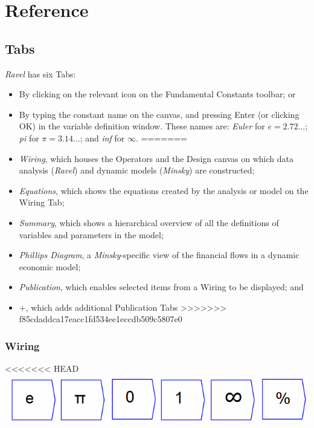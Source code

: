 
\chapter{Reference}

\section{Tabs}

\emph{Ravel} has six Tabs:
\begin{itemize}
<<<<<<< HEAD
\item By clicking on the relevant icon on the Fundamental Constants
  toolbar; or
\item By typing the constant name on the canvas, and pressing Enter
  (or clicking OK) in the variable definition window. These names are:
  \textit{Euler} for $e=2.72\ldots$; \textit{pi} for $\pi=3.14\ldots$;
  and \textit{inf} for $\infty$.
=======
\item \emph{Wiring}, which houses the Operators and the Design canvas on
which data analysis (\emph{Ravel}) and dynamic models (\emph{Minsky})
are constructed;
\item \emph{Equations}, which shows the equations created by the analysis
or model on the Wiring Tab;
\item \emph{Summary}, which shows a hierarchical overview of all the definitions
of variables and parameters in the model;
\item \emph{Phillips Diagram}, a \emph{Minsky}-specific view of the financial
flows in a dynamic economic model;
\item \emph{Publication}, which enables selected items from a Wiring to
be displayed; and
\item +, which adds additional Publication Tabs
>>>>>>> f85cdaddca17eacc1fd534ee1eccdb509c5807e0
\end{itemize}

\subsection{Wiring}

<<<<<<< HEAD
\includegraphics{images/FundamentalConstants.png} 
 	
